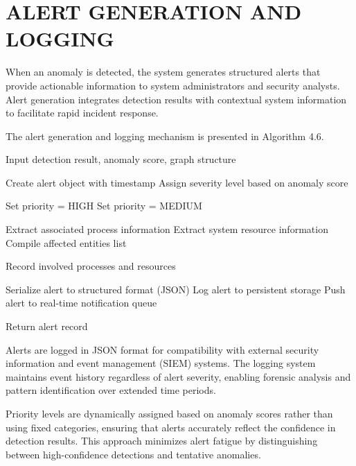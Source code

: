 \section{\uppercase{ALERT GENERATION AND LOGGING}}

When an anomaly is detected, the system generates structured alerts that provide actionable information to system administrators and security analysts. Alert generation integrates detection results with contextual system information to facilitate rapid incident response.

The alert generation and logging mechanism is presented in Algorithm 4.6.

\begin{algorithm}
\caption{Alert Generation and Logging}
\begin{algorithmic}[1]

\State Input detection result, anomaly score, graph structure

\State Create alert object with timestamp
\State Assign severity level based on anomaly score

\State Set priority = HIGH
\Else
\State Set priority = MEDIUM
\EndIf

\State Extract associated process information
\State Extract system resource information
\State Compile affected entities list

\State Record involved processes and resources
\EndFor

\State Serialize alert to structured format (JSON)
\State Log alert to persistent storage
\State Push alert to real-time notification queue

\State Return alert record

\end{algorithmic}
\end{algorithm}

Alerts are logged in JSON format for compatibility with external security information and event management (SIEM) systems. The logging system maintains event history regardless of alert severity, enabling forensic analysis and pattern identification over extended time periods.

Priority levels are dynamically assigned based on anomaly scores rather than using fixed categories, ensuring that alerts accurately reflect the confidence in detection results. This approach minimizes alert fatigue by distinguishing between high-confidence detections and tentative anomalies.



